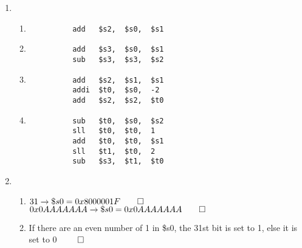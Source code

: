 \documentclass[12pt, a4paper]{article}
\begin{document}
\begin{enumerate}[Q\arabic*.]
  \item 
    \begin{enumerate}[\alph*.]
      \item 
        \begin{lstlisting}
          add   $s2,  $s0,  $s1
        \end{lstlisting}
      \hfill
      \item 
        \begin{lstlisting}
          add   $s3,  $s0,  $s1
          sub   $s3,  $s3,  $s2
        \end{lstlisting}
        \hfill
      \item 
        \begin{lstlisting}
          add   $s2,  $s1,  $s1
          addi  $t0,  $s0,  -2
          add   $s2,  $s2,  $t0
        \end{lstlisting}
      \hfill
      \item 
        \begin{lstlisting}
          sub   $t0,  $s0,  $s2
          sll   $t0,  $t0,  1
          add   $t0,  $t0,  $s1
          sll   $t1,  $t0,  2
          sub   $s3,  $t1,  $t0
        \end{lstlisting}
    \end{enumerate}

  \item 
    \begin{enumerate}[\alph*.]
      \item $31 \rightarrow \$s0 = 0x8000 001F \qed$\\
        $0x0AAAAAAA \rightarrow \$s0 = 0x0AAA AAAA \qed$
      \item If there are an even number of 1 in \$s0, the 31st bit is set to 1, else it is set to 0 $\qed$
    \end{enumerate}
\end{enumerate}
\end{document}
